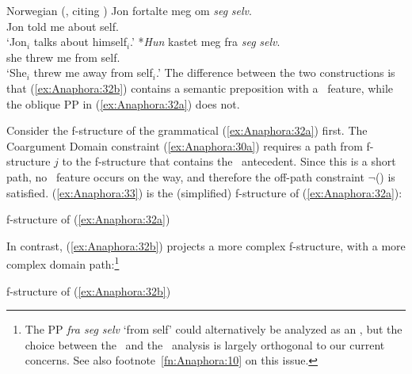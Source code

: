 \documentclass[output=paper,hidelinks]{langscibook}
\begin{document}
\ea\label{ex:Anaphora:32} Norwegian (\citealt[505--506]{DLM:LFG}, citing \citealt[67,~69]{Hellan88})
\ea\label{ex:Anaphora:32a}\gll
Jon fortalte meg  om  \textit{seg}    \textit{selv}.\\
 Jon told  me  about    self.\\
 \glt`Jon$_i$ talks about himself$_i$.'
\ex\label{ex:Anaphora:32b}\gll
 *\textit{Hun}  kastet meg  fra  \textit{seg}   \textit{selv}.\\
 she  threw me  from   self.\\
 \glt`She$_i$ threw me away from self$_i$.'
\z\z
\noindent The difference between the two constructions is that (\ref{ex:Anaphora:32b}) contains a semantic preposition with a \PRED\ feature, while the oblique PP in (\ref{ex:Anaphora:32a}) does not.

Consider the f-structure of the grammatical (\ref{ex:Anaphora:32a}) first. The Coargument Domain constraint (\ref{ex:Anaphora:30a}) requires a path from f-structure $j$ to the f-structure that contains the \SUBJ\ antecedent. Since this is a short path, no \PRED\ feature occurs on the way, and therefore the off-path constraint $\neg$(\RIGHT\PRED) is satisfied. (\ref{ex:Anaphora:33}) is the (simplified) f-structure of (\ref{ex:Anaphora:32a}):

\ea\label{ex:Anaphora:33} f-structure of (\ref{ex:Anaphora:32a})\\[1ex]
\z

\noindent In contrast, (\ref{ex:Anaphora:32b}) projects a more complex f-structure, with a more complex domain path:\footnote{The PP \emph{fra seg selv} `from self' could alternatively be analyzed as an \OBL, but the choice between the \ADJ\ and the \OBL\ analysis is largely orthogonal to our current concerns. See also footnote~\ref{fn:Anaphora:10} on this issue.}

\ea\label{ex:Anaphora:34} f-structure of (\ref{ex:Anaphora:32b})\\[1ex]
{}
\z
\end{document}
